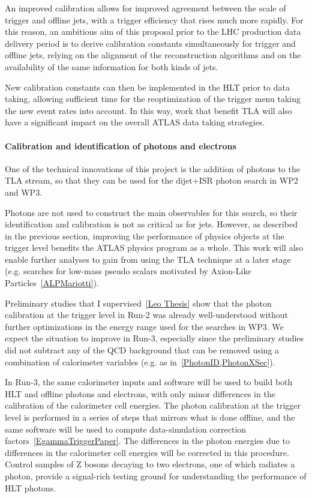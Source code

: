 An improved calibration allows for improved agreement between the scale of trigger and offline jets, with a trigger efficiency that rises much more rapidly. 
For this reason, an ambitious aim of this proposal prior to the LHC production data delivery period is to derive calibration constants simultaneously for trigger and offline jets, relying on the alignment of the reconstruction algorithms and on the availability of the same information for both kinds of jets. 

New calibration constants can then be implemented in the HLT prior to data taking, allowing sufficient time for the reoptimization of the trigger menu taking the new event rates into account. In this way, work that benefit TLA will also have a significant impact on the overall ATLAS data taking strategies. 

\paragraph{Calibration and identification of photons and electrons}
One of the technical innovations of this project is the addition of photons to the TLA stream, so that they can be used for the dijet+ISR photon search in WP2 and WP3.

Photons are not used to construct the main observables for this search, so their identification and calibration is not as critical as for jets. However, as described in the previous section, improving the performance of physics objects at the trigger level benefits the ATLAS physics program as a whole. This work will also enable further analyses to gain from using the TLA technique at a later stage (e.g. searches for low-mass pseudo scalars motivated by Axion-Like Particles~\ref{ALPMariotti}). 

Preliminary studies that I supervised~\ref{Leo Thesis} show that the photon calibration at the trigger level in Run-2 was already well-understood without further optimizations in the energy range used for the searches in WP3. We expect the situation to improve in Run-3, especially since the preliminary studies did not subtract any of the QCD background that can be removed using a combination of calorimeter variables (e.g. as in~\ref{PhotonID,PhotonXSec}). 

In Run-3, the same calorimeter inputs and software will be used to build both HLT and offline photons and electrons, with only minor differences in the calibration of the calorimeter cell energies. The photon calibration at the trigger level is performed in a series of steps that mirrors what is done offline, and the same software will be used to compute data-simulation correction factors~\ref{EgammaTriggerPaper}. The differences in the photon energies due to differences in the calorimeter cell energies will be corrected in this procedure. Control samples of Z bosons decaying to two electrons, one of which radiates a photon, provide a signal-rich testing ground for understanding the performance of HLT photons.  

